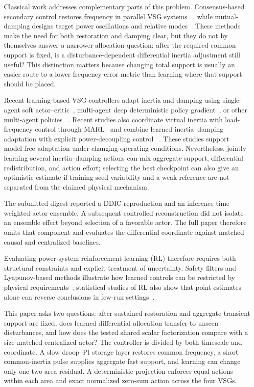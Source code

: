 \documentclass[conference,a4paper]{IEEEtran}
\begin{document}
Classical work addresses complementary parts of this problem. Consensus-based
secondary control restores frequency in parallel VSG systems
~\cite{liu2020consensus,shi2021restoration}, while mutual-damping designs target
power oscillations and relative modes~\cite{fu2022mutual,gao2024mutual}. These
methods make the need for both restoration and damping clear, but they do not
by themselves answer a narrower allocation question: after the required
common support is fixed, is a disturbance-dependent differential inertia
adjustment still useful? This distinction matters because changing total
support is usually an easier route to a lower frequency-error metric than
learning where that support should be placed.

Recent learning-based VSG controllers adapt inertia and damping using
single-agent soft actor--critic~\cite{lu2024sac}, multi-agent deep deterministic
policy gradient~\cite{zhang2024maddpg}, or other multi-agent policies
~\cite{yang2023ddic,kang2025madrl}. Recent studies also coordinate virtual
inertia with load-frequency control through MARL~\cite{ali2026fuzzy} and combine
learned inertia--damping adaptation with explicit power-decoupling control
~\cite{peng2026cooperative}. These studies support model-free adaptation
under changing operating conditions. Nevertheless, jointly learning several
inertia--damping actions can mix aggregate support, differential
redistribution, and action effort; selecting the best checkpoint can also give
an optimistic estimate if training-seed variability and a weak reference are
not separated from the claimed physical mechanism.

The submitted digest reported a DDIC reproduction and an inference-time
weighted actor ensemble. A subsequent controlled reconstruction did not isolate
an ensemble effect beyond selection of a favorable actor. The full paper
therefore omits that component and evaluates the differential coordinate
against matched causal and centralized baselines.

Evaluating power-system reinforcement learning (RL) therefore requires both
structural constraints and explicit treatment of uncertainty. Safety filters
and Lyapunov-based methods illustrate how learned controls can be restricted by
physical requirements~\cite{tabas2022safe,shuai2025safe}; statistical studies
of RL also show that point estimates alone can reverse conclusions in few-run
settings~\cite{agarwal2021statistical}.

This paper asks two questions: after sustained restoration
and aggregate transient support are fixed, does learned differential allocation
transfer to unseen disturbances, and how does the tested shared scalar
factorization compare with a size-matched centralized actor? The controller is
divided by both
timescale and coordinate. A slow droop--PI storage layer restores common
frequency, a short common-inertia pulse supplies aggregate fast support, and
learning can change only one two-area residual. A deterministic projection
enforces equal actions within each area and exact normalized zero-sum action
across the four VSGs.
\end{document}
